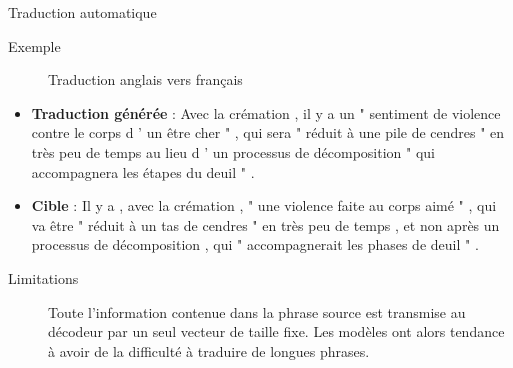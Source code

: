 \documentclass[french]{beamer}
\begin{document}
\begin{frame}{Traduction automatique}

\begin{description}
	\item [Exemple] Traduction anglais vers français \cite{sutskever2014sequence}
\end{description}
\vspace{.5cm}
\begin{itemize}
	\item \textbf{Traduction générée} : Avec la crémation , il y a un " sentiment de violence contre le corps d ' un être cher " , qui sera " réduit à une pile de cendres " en très peu de temps au lieu d ' un processus de décomposition " qui accompagnera les étapes du deuil " .

	\item \textbf{Cible} : Il y a , avec la crémation , " une violence faite au corps aimé " , qui va être " réduit à un tas de cendres " en très peu de temps , et non après un processus de décomposition , qui " accompagnerait les phases de deuil " .
\end{itemize}

\begin{description}
	\item [Limitations] Toute l'information contenue dans la phrase source est transmise au décodeur par un seul vecteur de taille fixe. Les modèles ont alors tendance à avoir de la difficulté à traduire de longues phrases.
\end{description}

\end{frame}
\end{document}
